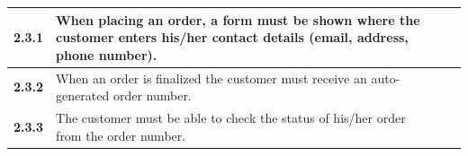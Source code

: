 \documentclass[a4paper,12pt]{article}
\begin{document}
\begin{table}[]
\begin{tabular}{|l|L{8cm}|L{2.5cm}|L{2.5cm}|}
		\textbf{2.3.1} & When placing an order, a form must be shown where the customer enters his/her contact details (email, address, phone number).                      &          &        \\ \hline
		\textbf{2.3.2} & When an order is finalized the customer must receive an auto-generated order number.                                                                                                          &          &        \\ \hline
		\textbf{2.3.3} & The customer must be able to check the status of his/her order from the order number.                                                                                                         &          &        \\ \hline
	\end{tabular}
\end{table}
\end{document}
